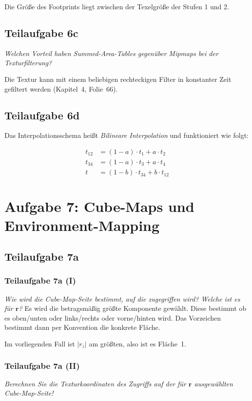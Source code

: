 \documentclass[a4paper]{scrartcl}
\begin{document}
Die Größe des Footprints liegt zwischen der Texelgröße der Stufen 1 und 2.

\subsection*{Teilaufgabe 6c}
\textit{Welchen Vorteil haben Summed-Area-Tables gegenüber Mipmaps bei der Texturfilterung?}

Die Textur kann mit einem beliebigen rechteckigen Filter in konstanter Zeit gefiltert werden (Kapitel~4, Folie~66).

\subsection*{Teilaufgabe 6d}
Das Interpolationsschema heißt \textit{Bilineare Interpolation} und funktioniert wie folgt:

\begin{align}
    t_{12} &= (1-a) \cdot t_1 + a \cdot t_2\\
    t_{34} &= (1-a) \cdot t_3 + a \cdot t_4\\
    t      &= (1-b) \cdot t_{34} + b \cdot t_{12}
\end{align}

\section*{Aufgabe 7: Cube-Maps und Environment-Mapping}
\subsection*{Teilaufgabe 7a}
\subsubsection*{Teilaufgabe 7a (I)}
\textit{Wie wird die Cube-Map-Seite bestimmt, auf die zugegriffen wird? Welche ist es für $\mathbf{r}$?}
Es wird die betragsmäßig größte Komponente gewählt. Diese bestimmt ob es
oben/unten oder links/rechts oder vorne/hinten wird. Das Vorzeichen bestimmt
dann per Konvention die konkrete Fläche.

Im vorliegenden Fall ist $|r_z|$ am größten, also ist es Fläche~1.

\subsubsection*{Teilaufgabe 7a (II)}
\textit{Berechnen Sie die Texturkoordinaten des Zugriffs auf der für $\mathbf{r}$ ausgewählten Cube-Map-Seite!}
\end{document}
